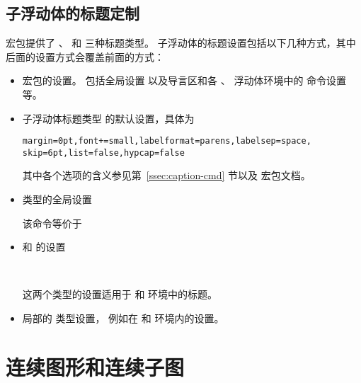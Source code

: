 \subsection{子浮动体的标题定制}

 宏包提供了 、 和  三种标题类型。
子浮动体的标题设置包括以下几种方式，其中后面的设置方式会覆盖前面的方式：
\begin{itemize}
	\item {} 宏包的设置。
	包括全局设置  以及导言区和各 、 浮动体环境中的  命令设置等。
	
	\item 子浮动体标题类型  的默认设置，具体为
\begin{lstlisting}
margin=0pt,font+=small,labelformat=parens,labelsep=space,
skip=6pt,list=false,hypcap=false
\end{lstlisting}
	其中各个选项的含义参见第~\ref{ssec:caption-cmd} 节以及  宏包文档\cite{caption-doc}。
	
	\item {} 类型的全局设置
	\begin{center}
	\end{center}
	该命令等价于
	\begin{center}
	\end{center}
	
	\item {} 和  的设置
	\begin{center}
		\\
	\end{center}
	这两个类型的设置适用于  和  环境中的标题。
	
	\item 局部的  类型设置，
	例如在  和  环境内的设置。
	\begin{center}
	\end{center}
\end{itemize}

\section{连续图形和连续子图}\label{sec:contfig}

